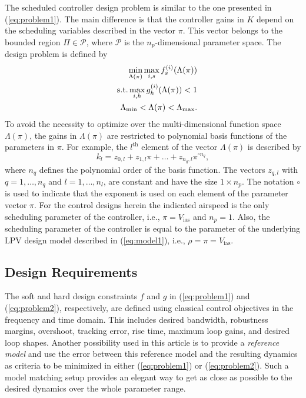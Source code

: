 \documentclass[aerospace,article,submit,moreauthors,pdftex,10pt,a4paper]{Definitions/mdpi}
\begin{document}
The scheduled controller design problem \cite{Apkarian15} is similar to the one presented in (\ref{eq:problem1}). The main difference is that the controller gains in $K$ depend on the scheduling variables  described in the vector $\pi$. This vector belongs to the bounded region  $\Pi \in \mathcal{P}$, where $\mathcal{P}$ is the $n_p$-dimensional parameter space. The design problem is defined by
\begin{eqnarray}\label{eq:problem2}
&&\min_{\Lambda(\pi)} \max_{i,s} f_{s}^{(i)}(\Lambda(\pi)) \\
&&\textnormal{s.t.} \max_{i,h} g_{h}^{(i)}(\Lambda(\pi)) < 1 \nonumber \\
&& \Lambda_{\min} < \Lambda(\pi) < \Lambda_{\max}. \nonumber 
\end{eqnarray}
To avoid the necessity to optimize over the multi-dimensional function space $\Lambda(\pi)$, the gains in $\Lambda(\pi)$ are restricted to polynomial basis functions of the parameters in $\pi$. For example, the $l^{\text{th}}$ element of the vector $\Lambda(\pi)$ is described by
\begin{equation}\label{eq:basisf}
k_l = z_{0,l} + z_{1,l} \pi + \dots + z_{n_q,l} \pi^{\circ n_q},
\end{equation}
where $n_q$ defines the  polynomial order of the basis function. The vectors $z_{q,l}$ with $q = 1,\dots,n_q$ and $l = 1,\dots, n_l$, are constant and have the size $1 \times n_p$. The notation $\circ$ is used to indicate that the exponent is used on each element of the parameter vector $\pi$. For the control designs herein the indicated airspeed is the only  scheduling parameter of the controller, i.e., $\pi = V_{\text{ias}}$ and $n_p = 1$. Also, the scheduling parameter of the controller is equal to the  parameter of the underlying LPV design model described in (\ref{eq:model1}), i.e., $\rho = \pi = V_{\text{ias}}$. 


\subsection{Design Requirements}
The soft and hard design constraints $f$ and $g$ in (\ref{eq:problem1}) and (\ref{eq:problem2}), respectively,  are defined using classical control objectives in the frequency and time domain. This includes desired bandwidth, robustness margins, overshoot, tracking error, rise time, maximum loop gains, and desired loop shapes.
Another possibility used in this article is to provide a \textit{reference model} and use the error between this reference model and the resulting dynamics as criteria to be minimized in either (\ref{eq:problem1}) or (\ref{eq:problem2}). Such a model matching setup provides an elegant way to get as close as possible to the desired dynamics over the whole parameter range.
\end{document}

